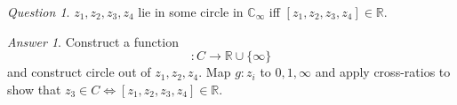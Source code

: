 \documentclass[]{article}
\def\reals{\mathbb{R}}
\def\complex{\mathbb{C}}
\theoremstyle{remark}
\theoremstyle{qnstyle}
\newtheorem{question}{Question}
\theoremstyle{answerstyle}
\newtheorem*{answer}{Answer}
\begin{document}
\begin{question}
    $z_1, z_2, z_3, z_4$ lie in some circle in $\complex_\infty$ iff
    $[z_1, z_2, z_3, z_4] \in \reals$.
\end{question}
\begin{answer}
    Construct a function
        $$: C \to \reals \cup \{ \infty \}$$
    and construct circle out of $z_1, z_2, z_4$. Map $g: z_i$ to $0,1,\infty$
    and apply cross-ratios to show that $z_3 \in C \iff [z_1, z_2, z_3,z_4] \in \reals$.
\end{answer}
\end{document}
